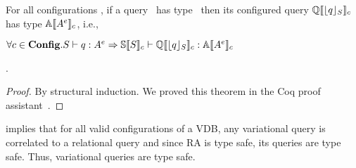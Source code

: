 \begin{theorem}
\label{thm:var-pres}
For all configurations \config, if a query \vQ\ has type \annot \vType\ 
then its configured query \ensuremath{\eeSem {\constrain \vQ}}
has type \ensuremath{\olSem {\annot \vType}}, i.e., \\
\centerline{
\ensuremath{
\forall \config \in \confSet. \envWithoutVctx { \vQ} {\annot \vType} \Rightarrow 
\pEnv [\osSem {\vSch}] {\eeSem {\constrain \vQ}} {\olSem {\annot \vType}}
}}.
\end{theorem}

\begin{proof}
By structural induction. We proved this theorem in the Coq proof assistant~\cite{Khan21}.
\end{proof}


 implies that for all valid configurations of a VDB, any variational
query is correlated to a relational query and since RA is type safe, its queries are
type safe. Thus, variational queries are type safe. 

